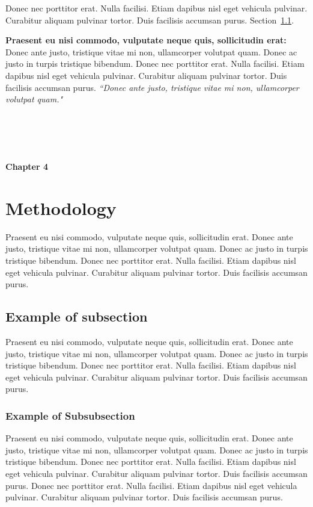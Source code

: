 \documentclass[12pt]{article}  %
\theoremstyle{plain}
\begin{document}
Donec nec porttitor erat. Nulla facilisi. Etiam dapibus nisl eget vehicula pulvinar. Curabitur aliquam pulvinar tortor. Duis facilisis accumsan purus. Section~\ref{section:preprocessing}.

\textbf{Praesent eu nisi commodo, vulputate neque quis, sollicitudin erat:} Donec ante justo, tristique vitae mi non, ullamcorper volutpat quam. Donec ac justo in turpis tristique bibendum. Donec nec porttitor erat. Nulla facilisi. Etiam dapibus nisl eget vehicula pulvinar. Curabitur aliquam pulvinar tortor. Duis facilisis accumsan purus. \textit{``Donec ante justo, tristique vitae mi non, ullamcorper volutpat quam."}

\newpage
\noindent
\\\\\\\\
{\LARGE \bf Chapter 4}
\section{Methodology}
\label{section:methodology}
Praesent eu nisi commodo, vulputate neque quis, sollicitudin erat. Donec ante justo, tristique vitae mi non, ullamcorper volutpat quam. Donec ac justo in turpis tristique bibendum. Donec nec porttitor erat. Nulla facilisi. Etiam dapibus nisl eget vehicula pulvinar. Curabitur aliquam pulvinar tortor. Duis facilisis accumsan purus.

\subsection{Example of subsection}
\label{section:preprocessing}
Praesent eu nisi commodo, vulputate neque quis, sollicitudin erat. Donec ante justo, tristique vitae mi non, ullamcorper volutpat quam. Donec ac justo in turpis tristique bibendum. Donec nec porttitor erat. Nulla facilisi. Etiam dapibus nisl eget vehicula pulvinar. Curabitur aliquam pulvinar tortor. Duis facilisis accumsan purus.

\subsubsection{Example of  Subsubsection}
\label{section:hyperlinks}
Praesent eu nisi commodo, vulputate neque quis, sollicitudin erat. Donec ante justo, tristique vitae mi non, ullamcorper volutpat quam. Donec ac justo in turpis tristique bibendum. Donec nec porttitor erat. Nulla facilisi. Etiam dapibus nisl eget vehicula pulvinar. Curabitur aliquam pulvinar tortor. Duis facilisis accumsan purus. Donec nec porttitor erat. Nulla facilisi. Etiam dapibus nisl eget vehicula pulvinar. Curabitur aliquam pulvinar tortor. Duis facilisis accumsan purus.
\end{document}

